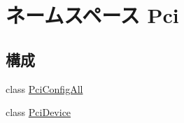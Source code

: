 \hypertarget{namespacePci}{
\section{ネームスペース Pci}
\label{namespacePci}
}
\subsection*{構成}
\begin{DoxyCompactItemize}
\item 
class \hyperlink{classPci_1_1PciConfigAll}{PciConfigAll}
\item 
class \hyperlink{classPci_1_1PciDevice}{PciDevice}
\end{DoxyCompactItemize}
